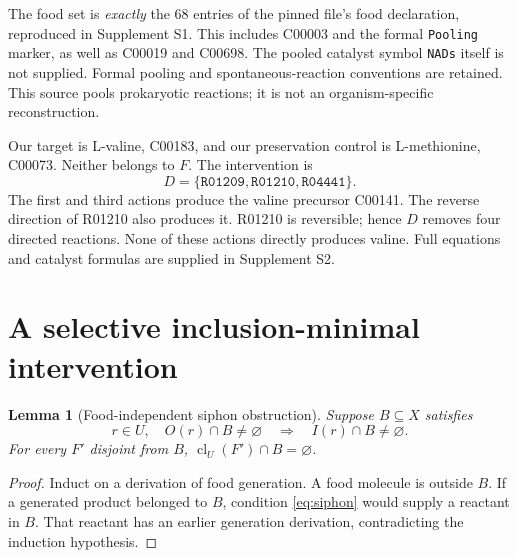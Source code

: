 \documentclass[11pt]{article}
\newtheorem{lemma}[theorem]{Lemma}
\theoremstyle{definition}\newtheorem{definition}[theorem]{Definition}
\newcommand{\cl}{\operatorname{cl}}
\newcommand{\rxn}[1]{\texttt{#1}}
\begin{document}
The food set is \emph{exactly} the 68 entries of the pinned file's food declaration, reproduced in Supplement S1. This includes C00003 and the formal \rxn{Pooling} marker, as well as C00019 and C00698. The pooled catalyst symbol \rxn{NADs} itself is not supplied. Formal pooling and spontaneous-reaction conventions are retained. This source pools prokaryotic reactions; it is not an organism-specific reconstruction.

Our target is L-valine, C00183, and our preservation control is L-methionine, C00073. Neither belongs to $F$. The intervention is
\begin{equation}\label{eq:cut}
 D=\{\rxn{R01209},\rxn{R01210},\rxn{R04441}\}.
\end{equation}
The first and third actions produce the valine precursor C00141. The reverse direction of R01210 also produces it. R01210 is reversible; hence $D$ removes four directed reactions. None of these actions directly produces valine. Full equations and catalyst formulas are supplied in Supplement S2.

\section{A selective inclusion-minimal intervention}
\begin{lemma}[Food-independent siphon obstruction]\label{lem:barrier}
Suppose $B\subseteq X$ satisfies
\begin{equation}\label{eq:siphon}
 r\in U,\quad O(r)\cap B\ne\varnothing
 \quad\Longrightarrow\quad I(r)\cap B\ne\varnothing.
\end{equation}
For every $F'$ disjoint from $B$, $\cl_U(F')\cap B=\varnothing$.
\end{lemma}
\begin{proof}
Induct on a derivation of food generation. A food molecule is outside $B$. If a generated product belonged to $B$, condition \eqref{eq:siphon} would supply a reactant in $B$. That reactant has an earlier generation derivation, contradicting the induction hypothesis.
\end{proof}
\end{document}

